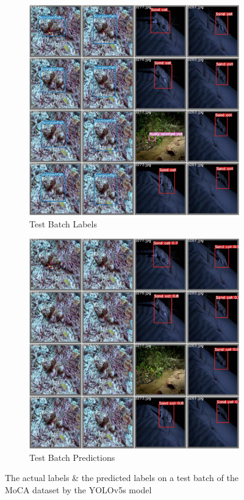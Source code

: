 \documentclass[conference]{IEEEtran}
\begin{document}
\begin{figure}[ht]
\centering
\begin{subfigure}{0.7\linewidth}
    \includegraphics[width=1\textwidth]{Experiments/MoCA/test_batch1_labels.jpg}
    \caption{Test Batch Labels}
    \label{fig:moca_label}
\end{subfigure}
\hfill
\begin{subfigure}{0.7\linewidth}
    \includegraphics[width=1\textwidth]{Experiments/MoCA/test_batch1_pred.jpg}
    \caption{Test Batch Predictions}
    \label{fig:moca_pred}
\end{subfigure}
\caption{The actual labels \& the predicted labels on a test batch of the MoCA dataset by the YOLOv5s model}
\label{fig:moca}
\end{figure}
\end{document}
